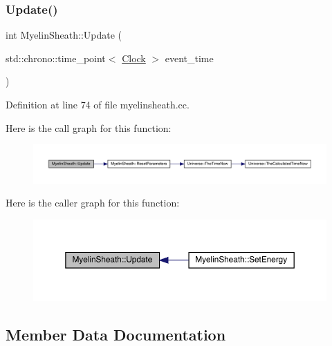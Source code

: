 \subsubsection{\texorpdfstring{Update()}{Update()}}
{\footnotesize\ttfamily int Myelin\+Sheath\+::\+Update (\begin{DoxyParamCaption}\item[{std\+::chrono\+::time\+\_\+point$<$ \hyperlink{universe_8h_a0ef8d951d1ca5ab3cfaf7ab4c7a6fd80}{Clock} $>$}]{event\+\_\+time }\end{DoxyParamCaption})}



Definition at line 74 of file myelinsheath.\+cc.

Here is the call graph for this function\+:
\nopagebreak
\begin{figure}[H]
\begin{center}
\leavevmode
\includegraphics[width=350pt]{class_myelin_sheath_af53c8f36ee963168dec09b74a6be8e4c_cgraph}
\end{center}
\end{figure}
Here is the caller graph for this function\+:
\nopagebreak
\begin{figure}[H]
\begin{center}
\leavevmode
\includegraphics[width=350pt]{class_myelin_sheath_af53c8f36ee963168dec09b74a6be8e4c_icgraph}
\end{center}
\end{figure}


\subsection{Member Data Documentation}
\mbox{\label{class_myelin_sheath_a7877f5feab5bae37903653bf89dc3d5b}} 
